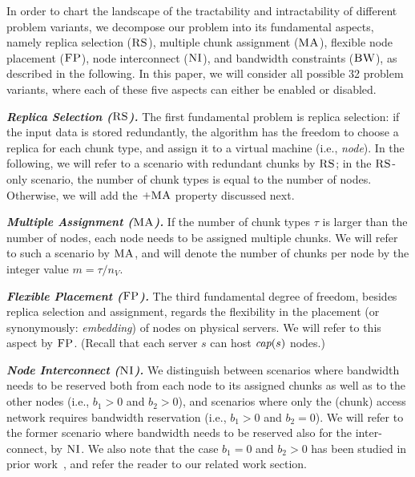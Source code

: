 \documentclass[9pt]{sigcomm-alternate}
\newcommand{\maciek}[1]{\textcolor{brown}{maciek: #1}}
\newcommand{\MaFactor}{m}
\newcommand{\capa}{\emph{cap}}
\newcommand{\CC}{\textsc{NI}}
\newcommand{\FP}{\textsc{FP}}
\newcommand{\RS}{\textsc{RS}}
\newcommand{\BW}{\textsc{BW}}
\newcommand{\MA}{\textsc{MA}}
\newcommand{\CostTrans}{\ensuremath{b_1}}
\newcommand{\CostCom}{\ensuremath{b_2}}
\begin{document}
In order to chart the landscape of the tractability and intractability of different
problem variants, we decompose our problem into its fundamental aspects, namely replica selection
($\RS$), multiple chunk assignment ($\MA$), flexible node placement ($\FP$), node interconnect ($\CC$),
and bandwidth constraints ($\BW$), as described in the following.
In this paper, we will consider all possible 32 problem variants, where each of these five aspects
can either be enabled or disabled.

\textbf{\emph{Replica Selection ($\RS$).}} The first fundamental problem is replica selection:
if the input data is stored redundantly, the algorithm has the freedom to choose a replica
for each chunk type, and assign it to a virtual machine (i.e., \emph{node}).
In the following, we will refer to a scenario
with redundant chunks by $\RS$; in the $\RS$-only scenario, the number of chunk types
is equal to the number of nodes. Otherwise, we will add the $+\MA$ property discussed next.

\textbf{\emph{Multiple Assignment ($\MA$).}}
If the number of chunk types $\tau$ is larger than the number of nodes,
each node needs to be assigned multiple chunks. We will refer to such a scenario by $\MA$,
and will denote the number of chunks per node by the integer value $\MaFactor = \tau / n_V$.


\textbf{\emph{Flexible Placement ($\FP$).}} The third fundamental degree of freedom, besides replica selection and assignment,
regards the flexibility in the placement (or synonymously: \emph{embedding}) of nodes on physical servers.
We will refer to this aspect by $\FP$. (Recall that each server $s$ can host $\capa(s)$ nodes.)


\textbf{\emph{Node Interconnect ($\CC$).}} We distinguish between scenarios where bandwidth needs to be reserved
both from each node to its assigned chunks as well as to the other nodes
(i.e., $\CostTrans>0$ and $\CostCom>0$), and
 scenarios where only the (chunk) access network requires bandwidth reservation (i.e., $\CostTrans>0$ and $\CostCom=0$).
 We will refer to the former scenario
where bandwidth needs to be reserved also for the inter-connect, by $\CC$.
We also note that the case $\CostTrans=0$ and $\CostCom>0$ has been studied in prior work~\cite{oktopus,talk-about,proteus},
and refer the reader to our related work section.
\end{document}
